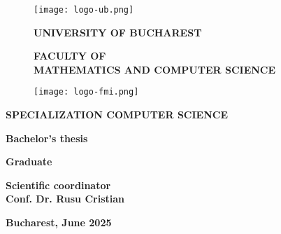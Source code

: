 \begin{titlepage}


\begin{figure}[!htb]
    \centering
    \begin{minipage}{0.2\textwidth}
        \texttt{[image: logo-ub.png]}
    \end{minipage}
    \begin{minipage}{0.5\textwidth}
        \large
        \vspace{0.2cm}
        \begin{center}
            \textbf{UNIVERSITY OF BUCHAREST}
        \end{center}
        \vspace{0.3cm}
        \begin{center}
            \textbf{
                FACULTY OF \\
                MATHEMATICS AND COMPUTER SCIENCE
            }
        \end{center}
    \end{minipage}
    \begin{minipage}{0.2\textwidth}
        \texttt{[image: logo-fmi.png]}
    \end{minipage}
\end{figure}

\begin{center}
\textbf{SPECIALIZATION COMPUTER SCIENCE}
\end{center}

\vspace{1cm}

\begin{center}
\Large \textbf{Bachelor's thesis}
\end{center}

\begin{center}
\huge \textbf{\MakeUppercase{\@title}}
\end{center}

\vspace{3cm}

\begin{center}
\large \textbf{Graduate \\ \@author}
\end{center}

\vspace{0.25cm}

\begin{center}
\large \textbf{Scientific coordinator \\ Conf. Dr. Rusu Cristian}
\end{center}

\vspace{2cm}

\begin{center}
\Large \textbf{Bucharest, June 2025}
\end{center}
\end{titlepage}